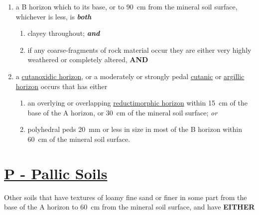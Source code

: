 \documentclass[
  letterpaper,
  DIV=11,
  numbers=noendperiod]{scrreprt}
\providecommand{\tightlist}{%
  \setlength{\itemsep}{0pt}\setlength{\parskip}{0pt}}\usepackage{longtable,booktabs,array}
\begin{document}
\begin{enumerate}
\def\labelenumi{\arabic{enumi}.}
\tightlist
\item
  a B horizon which to its base, or to 90~cm from the mineral soil
  surface, whichever is less, is \textbf{\emph{both}}

  \begin{enumerate}
  \def\labelenumii{(\alph{enumii})}
  \tightlist
  \item
    clayey throughout; \textbf{\emph{and}}
  \item
    if any coarse-fragments of rock material occur they are either very
    highly weathered or completely altered, \textbf{AND}
  \end{enumerate}
\item
  a \protect\hyperlink{sec-diag-cutoxh}{cutanoxidic horizon}, or a
  moderately or strongly pedal
  \protect\hyperlink{sec-diag-cuth}{cutanic} or
  \protect\hyperlink{sec-diag-argh}{argillic horizon} occurs that has
  either

  \begin{enumerate}
  \def\labelenumii{(\alph{enumii})}
  \tightlist
  \item
    an overlying or overlapping
    \protect\hyperlink{sec-diag-redmh}{reductimorphic horizon} within
    15~cm of the base of the A horizon, or 30~cm of the mineral soil
    surface; \emph{or}
  \item
    polyhedral peds 20~mm or less in size in most of the B horizon
    within 60~cm of the mineral soil surface.
  \end{enumerate}
\end{enumerate}

\hypertarget{sec-P}{%
\section{\texorpdfstring{\protect\hyperlink{sec-ord-P}{\textbf{P} -
Pallic Soils}}{P - Pallic Soils}}\label{sec-P}}

Other soils that have textures of loamy fine sand or finer in some part
from the base of the A horizon to 60~cm from the mineral soil surface,
and have \textbf{EITHER}
\end{document}
